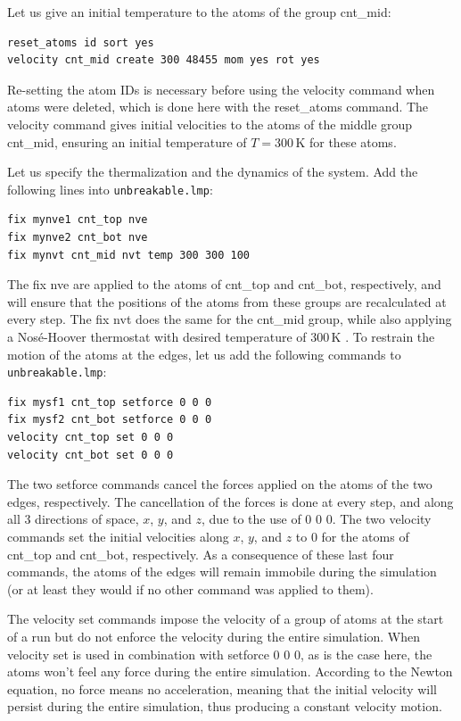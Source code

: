 \documentclass[9pt,tutorial]{livecoms}
\newcommand{\lmpcmd}[1]{\hspace{0pt}\colorbox{listing}{\textcolor{command}{\small{#1}}}\hspace{0pt}} %
\newcommand{\lmpcmdnote}[1]{\hspace{0pt}\colorbox{note_listing}{\textcolor{command}{\small{#1}}}\hspace{0pt}} %
\newcommand{\flecmd}[1]{\textcolor{command}{\texttt{#1}}} %
\begin{document}
Let us give an initial temperature to the atoms of the group \lmpcmd{cnt\_mid}:
\begin{lstlisting}
reset_atoms id sort yes
velocity cnt_mid create 300 48455 mom yes rot yes
\end{lstlisting}
Re-setting the atom IDs is necessary before using the \lmpcmd{velocity} command
when atoms were deleted, which is done here with the \lmpcmd{reset\_atoms} command.
The \lmpcmd{velocity} command gives initial velocities to the atoms of the middle
group \lmpcmd{cnt\_mid}, ensuring an initial temperature of $T = 300\,\text{K}$
for these atoms.

Let us specify the thermalization and the dynamics of the system.  Add the following
lines into \flecmd{unbreakable.lmp}:
\begin{lstlisting}
fix mynve1 cnt_top nve
fix mynve2 cnt_bot nve
fix mynvt cnt_mid nvt temp 300 300 100
\end{lstlisting}
The \lmpcmd{fix nve} are applied to the atoms of \lmpcmd{cnt\_top} and
\lmpcmd{cnt\_bot}, respectively, and will ensure that the positions of the atoms
from these groups are recalculated at every step.  The \lmpcmd{fix nvt} does the
same for the \lmpcmd{cnt\_mid} group, while also applying a Nos\'e-Hoover thermostat
with desired temperature of 300\,K \cite{nose1984unified, hoover1985canonical}.
To restrain the motion of the atoms at the edges, let us add the following
commands to \flecmd{unbreakable.lmp}:
\begin{lstlisting}
fix mysf1 cnt_top setforce 0 0 0
fix mysf2 cnt_bot setforce 0 0 0
velocity cnt_top set 0 0 0
velocity cnt_bot set 0 0 0
\end{lstlisting}
The two \lmpcmd{setforce} commands cancel the forces applied on the atoms of the
two edges, respectively.  The cancellation of the forces is done at every step,
and along all 3 directions of space, $x$, $y$, and $z$, due to the use of
\lmpcmd{0 0 0}.  The two \lmpcmd{velocity} commands set the initial velocities
along $x$, $y$, and $z$ to 0 for the atoms of \lmpcmd{cnt\_top} and
\lmpcmd{cnt\_bot}, respectively.  As a consequence of these last four commands,
the atoms of the edges will remain immobile during the simulation (or at least
they would if no other command was applied to them).

\begin{note}
  The \lmpcmdnote{velocity set}
  commands impose the velocity of a group of atoms at the start of a run but do
  not enforce the velocity during the entire simulation.  When \lmpcmdnote{velocity set}
  is used in combination with \lmpcmdnote{setforce 0 0 0}, as is the case here, the
  atoms won't feel any force during the entire simulation.  According to the Newton
  equation, no force means no acceleration, meaning that the initial velocity
  will persist during the entire simulation, thus producing a constant velocity motion.
\end{note}
\end{document}

